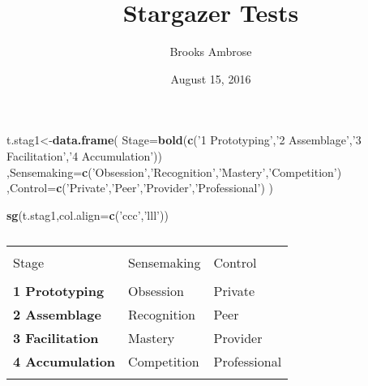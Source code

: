 \documentclass[]{article}
\title{Stargazer Tests}
\author{Brooks Ambrose}
\date{August 15, 2016}
\newenvironment{Shaded}{\begin{snugshade}}{\end{snugshade}}
\newcommand{\KeywordTok}[1]{\textcolor[rgb]{0.13,0.29,0.53}{\textbf{{#1}}}}
\newcommand{\DataTypeTok}[1]{\textcolor[rgb]{0.13,0.29,0.53}{{#1}}}
\newcommand{\StringTok}[1]{\textcolor[rgb]{0.31,0.60,0.02}{{#1}}}
\newcommand{\NormalTok}[1]{{#1}}
\begin{document}
\maketitle

\begin{Shaded}
\begin{Highlighting}[]
\NormalTok{t.stag1<-}\KeywordTok{data.frame}\NormalTok{(}
    \DataTypeTok{Stage=}\KeywordTok{bold}\NormalTok{(}\KeywordTok{c}\NormalTok{(}\StringTok{'1 Prototyping'}\NormalTok{,}\StringTok{'2 Assemblage'}\NormalTok{,}\StringTok{'3 Facilitation'}\NormalTok{,}\StringTok{'4 Accumulation'}\NormalTok{))}
    \NormalTok{,}\DataTypeTok{Sensemaking=}\KeywordTok{c}\NormalTok{(}\StringTok{'Obsession'}\NormalTok{,}\StringTok{'Recognition'}\NormalTok{,}\StringTok{'Mastery'}\NormalTok{,}\StringTok{'Competition'}\NormalTok{)}
    \NormalTok{,}\DataTypeTok{Control=}\KeywordTok{c}\NormalTok{(}\StringTok{'Private'}\NormalTok{,}\StringTok{'Peer'}\NormalTok{,}\StringTok{'Provider'}\NormalTok{,}\StringTok{'Professional'}\NormalTok{)}
    \NormalTok{)}

\KeywordTok{sg}\NormalTok{(t.stag1,}\DataTypeTok{col.align=}\KeywordTok{c}\NormalTok{(}\StringTok{'ccc'}\NormalTok{,}\StringTok{'lll'}\NormalTok{))}
\end{Highlighting}
\end{Shaded}

\begin{table}[!htbp] \centering 
  \caption{} 
  \label{} 
\begin{tabular}{@{\extracolsep{5pt}} lll} 
\\[-1.8ex]\hline 
\hline \\[-1.8ex] 
Stage & Sensemaking & Control \\ 
\hline \\[-1.8ex] 
 \textbf{1 Prototyping} & Obsession & Private \\ 
 \textbf{2 Assemblage} & Recognition & Peer \\ 
 \textbf{3 Facilitation} & Mastery & Provider \\ 
 \textbf{4 Accumulation} & Competition & Professional \\ 
\hline \\[-1.8ex] 
\end{tabular} 
\end{table}
\end{document}
